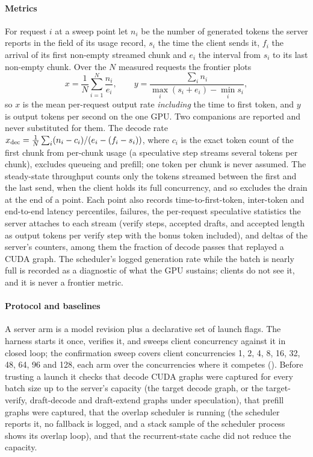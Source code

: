 \paragraph{Metrics}\label{sec:serving-metrics} For request $i$ at a sweep point let $n_i$ be the number of generated tokens the server reports in the  field of its usage record, $s_i$ the time the client sends it, $f_i$ the arrival of its first non-empty streamed chunk and $e_i$ the interval from $s_i$ to its last non-empty chunk. Over the $N$ measured requests the frontier plots
\begin{equation}
x=\frac1N\sum_{i=1}^N\frac{n_i}{e_i},\qquad y=\frac{\sum_in_i}{\max_i(s_i+e_i)-\min_is_i},\label{eq:frontier}
\end{equation}
so $x$ is the mean per-request output rate \emph{including} the time to first token, and $y$ is output tokens per second on the one GPU. Two companions are reported and never substituted for them. The decode rate $x_{\rm dec}=\frac1N\sum_i(n_i-c_i)/(e_i-(f_i-s_i))$, where $c_i$ is the exact token count of the first chunk from per-chunk usage (a speculative step streams several tokens per chunk), excludes queueing and prefill; one token per chunk is never assumed. The steady-state throughput counts only the tokens streamed between the first and the last send, when the client holds its full concurrency, and so excludes the drain at the end of a point. Each point also records time-to-first-token, inter-token and end-to-end latency percentiles, failures, the per-request speculative statistics the server attaches to each stream (verify steps, accepted drafts, and accepted length as output tokens per verify step with the bonus token included), and deltas of the server's counters, among them the fraction of decode passes that replayed a CUDA graph. The scheduler's logged generation rate while the batch is nearly full is recorded as a diagnostic of what the GPU sustains; clients do not see it, and it is never a frontier metric.

\paragraph{Protocol and baselines}\label{app:serving-protocol}\label{sec:serving-protocol} A server arm is a model revision plus a declarative set of launch flags. The harness starts it once, verifies it, and sweeps client concurrency against it in closed loop; the confirmation sweep covers client concurrencies 1, 2, 4, 8, 16, 32, 48, 64, 96 and 128, each arm over the concurrencies where it competes (). Before trusting a launch it checks that decode CUDA graphs were captured for every batch size up to the server's capacity (the target decode graph, or the target-verify, draft-decode and draft-extend graphs under speculation), that prefill graphs were captured, that the overlap scheduler is running (the scheduler reports it, no fallback is logged, and a stack sample of the scheduler process shows its overlap loop), and that the recurrent-state cache did not reduce the capacity.

